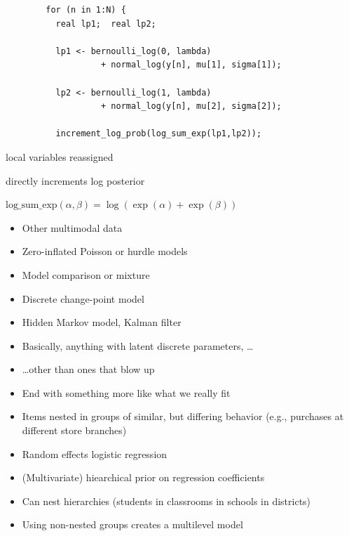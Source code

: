 \documentclass[10pt]{report}
\begin{document}
{\footnotesize
\begin{Verbatim}
        for (n in 1:N) {
          real lp1;  real lp2;

          lp1 <- bernoulli_log(0, lambda)               
                   + normal_log(y[n], mu[1], sigma[1]); 

          lp2 <- bernoulli_log(1, lambda)
                   + normal_log(y[n], mu[2], sigma[2]);

          increment_log_prob(log_sum_exp(lp1,lp2));  
\end{Verbatim}
}
\vspace*{2pt}
\begin{subitemize}
\item local variables reassigned
\item directly increments log posterior
\item $\mbox{log\_sum\_exp}(\alpha,\beta) = \log (\exp(\alpha) + \exp(\beta))$
\vspace*{10pt}
\end{subitemize}

\begin{itemize}
\item Other multimodal data
\item Zero-inflated Poisson or hurdle models
\item Model comparison or mixture
\item Discrete change-point model
\item Hidden Markov model, Kalman filter
\item Basically, anything with latent discrete parameters, \ldots
\hfill
\item \ldots other than ones that blow up
\end{itemize}

\begin{itemize}
\item End with something more like what we really fit
\item Items nested in groups of similar, but differing behavior
  (e.g., purchases at different store branches)
\item Random effects logistic regression 
\item (Multivariate) hiearchical prior on regression coefficients
\item Can nest hierarchies (students in classrooms in schools in
  districts)
\item Using non-nested groups creates a multilevel model
\end{itemize}
\end{document}
